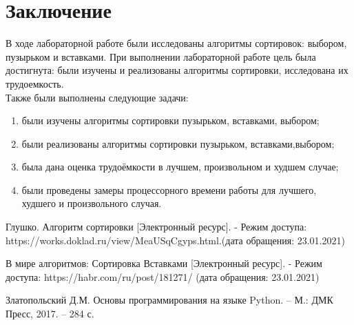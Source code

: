 \documentclass[a4paper,12pt]{article}
\newcommand{\anonsection}[1]{\section*{#1}\addcontentsline{toc}{section}{#1}}
\begin{document}
	\newpage
	
	\anonsection{Заключение}
	\hfill
	
	В ходе лабораторной работе были исследованы алгоритмы сортировок: выбором, пузырьком и вставками. При выполнении лабораторной работе цель была достигнута: были изучены и реализованы алгоритмы сортировки, исследована их трудоемкость.\\
	Также были выполнены следующие задачи: 
	
	\begin{enumerate} 
		\item были изучены алгоритмы сортировки пузырьком, вставками, выбором;
		\item были реализованы алгоритмы сортировки пузырьком, вставками,выбором;
		\item была дана оценка трудоёмкости в лучшем, произвольном и худшем случае;
		\item были проведены замеры процессорного времени работы для лучшего, худшего и произвольного случая.
	\end{enumerate}

	
	\newpage
	 \begin{thebibliography}{}
		\bibitem{} Глушко. Алгоритм сортировки [Электронный ресурс]. - Режим доступа: https://works.doklad.ru/view/MeaUSqCgyps.html.(дата обращения: 23.01.2021)
		
		\bibitem{} В мире алгоритмов: Сортировка Вставками [Электронный ресурс]. - Режим доступа: https://habr.com/ru/post/181271/ (дата обращения: 23.01.2021)
		
		\bibitem{} Златопольский Д.М. Основы программирования на языке Python. – М.: ДМК Пресс, 2017. – 284 с.
	\end{thebibliography} 
	
\end{document}
